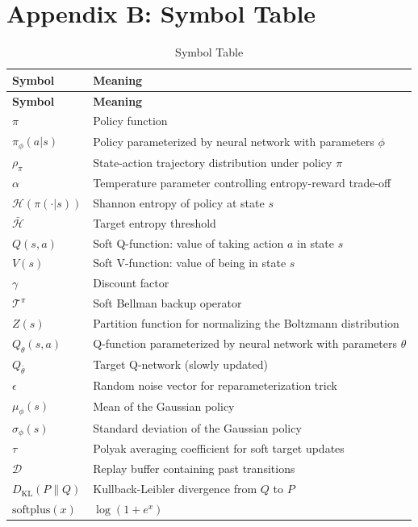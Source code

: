 \documentclass[12pt,a4paper]{article}
\theoremstyle{noteplain}
\theoremstyle{noteexercise}
\begin{document}


\section{Appendix B: Symbol Table}\label{sec:appendix-b}



\begin{longtable}{m{3cm}m{6cm}}
  \caption{Symbol Table} \label{tab:symbols} \\
  \toprule
  \textbf{Symbol} & \textbf{Meaning} \\
  \midrule
  \endfirsthead
  \toprule
  \textbf{Symbol} & \textbf{Meaning} \\
  \midrule
  \endhead
  \bottomrule
  \endlastfoot

  $\pi$ & Policy function \\
  $\pi_\phi(a|s)$ & Policy parameterized by neural network with parameters $\phi$ \\
  $\rho_\pi$ & State-action trajectory distribution under policy $\pi$ \\
  $\alpha$ & Temperature parameter controlling entropy-reward trade-off \\
  $\mathcal{H}(\pi(\cdot|s))$ & Shannon entropy of policy at state $s$ \\
  $\bar{\mathcal{H}}$ & Target entropy threshold \\
  $Q(s,a)$ & Soft Q-function: value of taking action $a$ in state $s$ \\
  $V(s)$ & Soft V-function: value of being in state $s$ \\
  $\gamma$ & Discount factor \\
  $\mathcal{T}^\pi$ & Soft Bellman backup operator \\
  $Z(s)$ & Partition function for normalizing the Boltzmann distribution \\
  $Q_\theta(s,a)$ & Q-function parameterized by neural network with parameters $\theta$ \\
  $Q_{\bar{\theta}}$ & Target Q-network (slowly updated) \\
  $\epsilon$ & Random noise vector for reparameterization trick \\
  $\mu_\phi(s)$ & Mean of the Gaussian policy \\
  $\sigma_\phi(s)$ & Standard deviation of the Gaussian policy \\
  $\tau$ & Polyak averaging coefficient for soft target updates \\
  $\mathcal{D}$ & Replay buffer containing past transitions \\
  $D_{\text{KL}}(P \| Q)$ & Kullback-Leibler divergence from $Q$ to $P$ \\
  $\text{softplus}(x)$ & $\log(1 + e^x)$ \\
\end{longtable}
\end{document}
